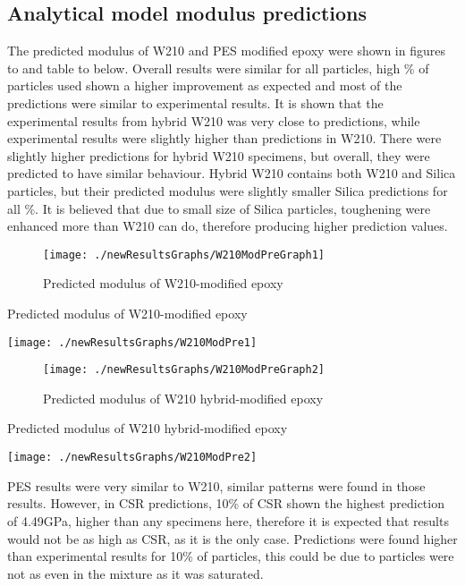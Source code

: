 \documentclass[numbers=noendperiod,chapterprefix=on]{icldt} %
\begin{document}
\subsection{Analytical model modulus predictions}
The predicted modulus of W210 and PES modified epoxy were shown in figures to and table to below. Overall results were similar for all particles, high \% of particles used shown a higher improvement as expected and most of the predictions were similar to experimental results. 
It is shown that the experimental results from hybrid W210 was very close to predictions, while experimental results were slightly higher than predictions in W210. There were slightly higher predictions for hybrid W210 specimens, but overall, they were predicted to have similar behaviour. Hybrid W210 contains both W210 and Silica particles, but their predicted modulus were slightly smaller Silica predictions for all \%. It is believed that due to small size of Silica particles, toughening were enhanced more than W210 can do, therefore producing higher prediction values.

\begin{figure}[!hp]
\centering
\texttt{[image: ./newResultsGraphs/W210ModPreGraph1]}
\caption{Predicted modulus of W210-modified epoxy}
\end{figure}
\FloatBarrier

\begin{table}[!htpb]
\centering
\caption{Predicted modulus of W210-modified epoxy} %
\texttt{[image: ./newResultsGraphs/W210ModPre1]}
\end{table}
\FloatBarrier

\begin{figure}[!t]
\centering
\texttt{[image: ./newResultsGraphs/W210ModPreGraph2]}
\caption{Predicted modulus of W210 hybrid-modified epoxy}
\end{figure}
\FloatBarrier

\begin{table}[!hp]
\centering
\caption{Predicted modulus of W210 hybrid-modified epoxy} %
\texttt{[image: ./newResultsGraphs/W210ModPre2]}
\end{table}
\FloatBarrier

PES results were very similar to W210, similar patterns were found in those results. However, in CSR predictions, 10\% of CSR shown the highest prediction of 4.49GPa, higher than any specimens here, therefore it is expected that results would not be as high as CSR, as it is the only case. Predictions were found higher than experimental results for 10\% of particles, this could be due to particles were not as even in the mixture as it was saturated.
\end{document}
